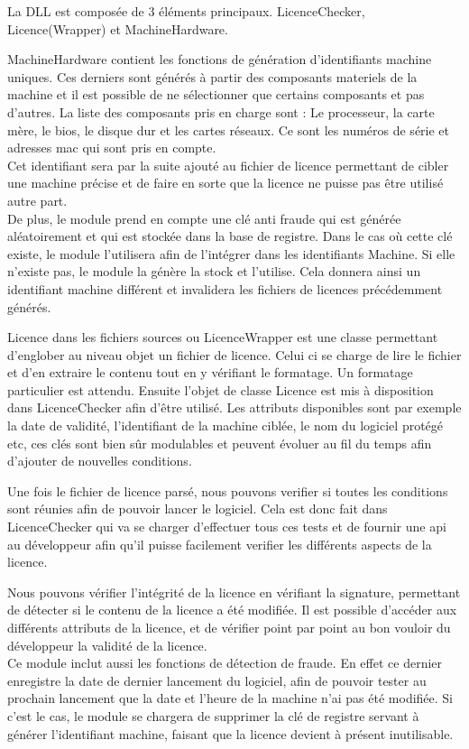 La DLL est composée de 3 éléments principaux. LicenceChecker, Licence(Wrapper) 
et MachineHardware.\newline

MachineHardware contient les fonctions de génération d'identifiants machine 
uniques. Ces derniers sont générés à partir des composants materiels de la 
machine et il est possible de ne sélectionner que certains composants et pas 
d'autres. La liste des composants pris en charge sont : Le processeur, 
la carte mère, le bios, le disque dur et les cartes réseaux. Ce sont les numéros
de série et adresses mac qui sont pris en compte.\\ 
Cet identifiant sera par la suite ajouté au fichier de licence permettant de 
cibler une machine précise et de faire en sorte que la licence ne puisse pas 
être utilisé autre part.\\
De plus, le module prend en compte une clé anti fraude qui est générée 
aléatoirement et qui est stockée dans la base de registre. Dans le cas où cette 
clé existe, le module l'utilisera afin de l'intégrer dans les identifiants 
Machine. Si elle n'existe pas, le module la génère la stock et l'utilise. Cela 
donnera ainsi un identifiant machine différent et invalidera les fichiers de 
licences précédemment générés.
\newline

Licence dans les fichiers sources ou LicenceWrapper est une classe permettant 
d'englober au niveau objet un fichier de licence. Celui ci se charge de lire le 
fichier et d'en extraire le contenu tout en y vérifiant le formatage. 
Un formatage particulier est attendu. Ensuite l'objet de classe Licence est mis
à disposition dans LicenceChecker afin d'être utilisé. Les attributs disponibles
sont par exemple la date de validité, l'identifiant de la machine ciblée, le nom
du logiciel protégé etc, ces clés sont bien sûr modulables et peuvent évoluer au 
fil du temps afin d'ajouter de nouvelles conditions.
\newline

Une fois le fichier de licence parsé, nous pouvons verifier si toutes les 
conditions sont réunies afin de pouvoir lancer le logiciel. Cela est donc fait 
dans LicenceChecker qui va se charger d'effectuer tous ces tests et de fournir 
une api au développeur afin qu'il puisse facilement verifier les différents 
aspects de la licence.
\newline

Nous pouvons vérifier l'intégrité de la licence en vérifiant la signature, 
permettant de détecter si le contenu de la licence a été modifiée. Il est 
possible d'accéder aux différents attributs de la licence, et de vérifier 
point par point au bon vouloir du développeur la validité de la licence.\\
Ce module inclut aussi les fonctions de détection de fraude. En effet ce 
dernier enregistre la date de dernier lancement du logiciel, afin de pouvoir 
tester au prochain lancement que la date et l'heure de la machine n'ai pas été
modifiée. Si c'est le cas, le module se chargera de supprimer la clé de registre
servant à générer l'identifiant machine, faisant que la licence devient 
à présent inutilisable.

